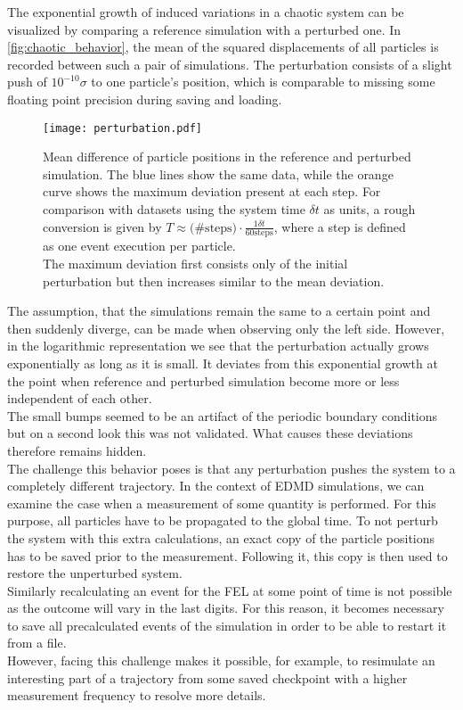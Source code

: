The exponential growth of induced variations in a chaotic system can be visualized by comparing a reference simulation with a perturbed one. In \autoref{fig:chaotic_behavior}, the mean of the squared displacements of all particles is recorded between such a pair of simulations. The perturbation consists of a slight push of $10^{-10} \sigma$ to one particle's position, which is comparable to missing some floating point precision during saving and loading.\\

\begin{figure}[h]
\centering
\texttt{[image: perturbation.pdf]}
\caption[Exponential growth of perturbations in chaotic system]{Mean difference of particle positions in the reference and perturbed simulation. The blue lines show the same data, while the orange curve shows the maximum deviation present at each step. For comparison with datasets using the system time $\delta t$ as units, a rough conversion is given by $T \approx \text{(\#steps)} \cdot \frac{1 \delta t}{60 \text{steps}}$, where a step is defined as one event execution per particle.\\ The maximum deviation first consists only of the initial perturbation but then increases similar to the mean deviation.}
\label{fig:chaotic_behavior}
\end{figure}

The assumption, that the simulations remain the same to a certain point and then suddenly diverge, can be made when observing only the left side. However, in the logarithmic representation we see that the perturbation actually grows exponentially as long as it is small. It deviates from this exponential growth at the point when reference and perturbed simulation become more or less independent of each other.\\
The small bumps seemed to be an artifact of the periodic boundary conditions but on a second look this was not validated. What causes these deviations therefore remains hidden.\\

The challenge this behavior poses is that any perturbation pushes the system to a completely different trajectory. In the context of EDMD simulations, we can examine the case when a measurement of some quantity is performed. For this purpose, all particles have to be propagated to the global time. To not perturb the system with this extra calculations, an exact copy of the particle positions has to be saved prior to the measurement. Following it, this copy is then used to restore the unperturbed system.\\ 
Similarly recalculating an event for the FEL at some point of time is not possible as the outcome will vary in the last digits. For this reason, it becomes necessary to save all precalculated events of the simulation in order to be able to restart it from a file.\\
However, facing this challenge makes it possible, for example, to resimulate an interesting part of a trajectory from some saved checkpoint with a higher measurement frequency to resolve more details. 
\newpage
